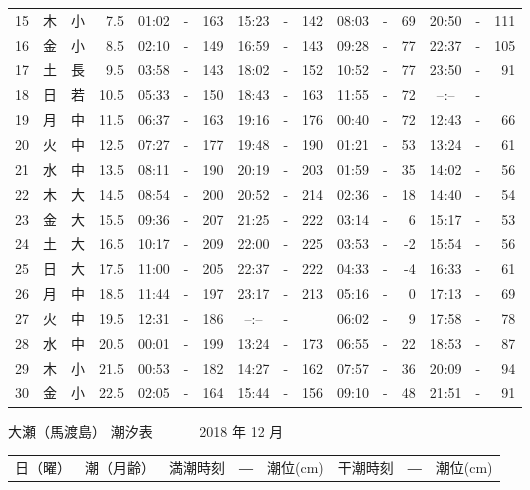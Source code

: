 \documentclass[12pt.a4j]{jsarticle}
\begin{document}
\begin{center}
\begin{table}[ht]
\begin{tabular}{|rc|cr|ccrccr|ccrccr|}
15 & 木 & 小 &  7.5 &  01:02 &-& 163  &  15:23 &-& 142  &   08:03 &-&  69  &   20:50 &-& 111  \\
16 & 金 & 小 &  8.5 &  02:10 &-& 149  &  16:59 &-& 143  &   09:28 &-&  77  &   22:37 &-& 105  \\
17 & 土 & 長 &  9.5 &  03:58 &-& 143  &  18:02 &-& 152  &   10:52 &-&  77  &   23:50 &-&  91  \\
18 & 日 & 若 & 10.5 &  05:33 &-& 150  &  18:43 &-& 163  &   11:55 &-&  72  &   --:-- &-&     \\
19 & 月 & 中 & 11.5 &  06:37 &-& 163  &  19:16 &-& 176  &   00:40 &-&  72  &   12:43 &-&  66  \\
20 & 火 & 中 & 12.5 &  07:27 &-& 177  &  19:48 &-& 190  &   01:21 &-&  53  &   13:24 &-&  61  \\
21 & 水 & 中 & 13.5 &  08:11 &-& 190  &  20:19 &-& 203  &   01:59 &-&  35  &   14:02 &-&  56  \\
22 & 木 & 大 & 14.5 &  08:54 &-& 200  &  20:52 &-& 214  &   02:36 &-&  18  &   14:40 &-&  54  \\
23 & 金 & 大 & 15.5 &  09:36 &-& 207  &  21:25 &-& 222  &   03:14 &-&   6  &   15:17 &-&  53  \\
24 & 土 & 大 & 16.5 &  10:17 &-& 209  &  22:00 &-& 225  &   03:53 &-&  -2  &   15:54 &-&  56  \\
25 & 日 & 大 & 17.5 &  11:00 &-& 205  &  22:37 &-& 222  &   04:33 &-&  -4  &   16:33 &-&  61  \\
26 & 月 & 中 & 18.5 &  11:44 &-& 197  &  23:17 &-& 213  &   05:16 &-&   0  &   17:13 &-&  69  \\
27 & 火 & 中 & 19.5 &  12:31 &-& 186  &  --:-- &-&     &   06:02 &-&   9  &   17:58 &-&  78  \\
28 & 水 & 中 & 20.5 &  00:01 &-& 199  &  13:24 &-& 173  &   06:55 &-&  22  &   18:53 &-&  87  \\
29 & 木 & 小 & 21.5 &  00:53 &-& 182  &  14:27 &-& 162  &   07:57 &-&  36  &   20:09 &-&  94  \\
30 & 金 & 小 & 22.5 &  02:05 &-& 164  &  15:44 &-& 156  &   09:10 &-&  48  &   21:51 &-&  91  \\
   \hline
   \end{tabular}
\end{table}
\newpage
 {\LARGE 大瀬（馬渡島）  潮汐表　　　}
 {\large 2018 年 12 月}\\
 \begin{table}[ht]
    \begin{tabular}{|rc|cr|ccrccr|ccrccr|}
    \hline
    \multicolumn{2}{|c|}{日（曜）} & \multicolumn{2}{c|}{潮（月齢）} & \multicolumn{6}{c|}{満潮時刻　―　潮位(cm)} & \multicolumn{6}{c|}{干潮時刻　―　潮位(cm)} \\

\end{tabular}
\end{table}
\end{center}
\end{document}
